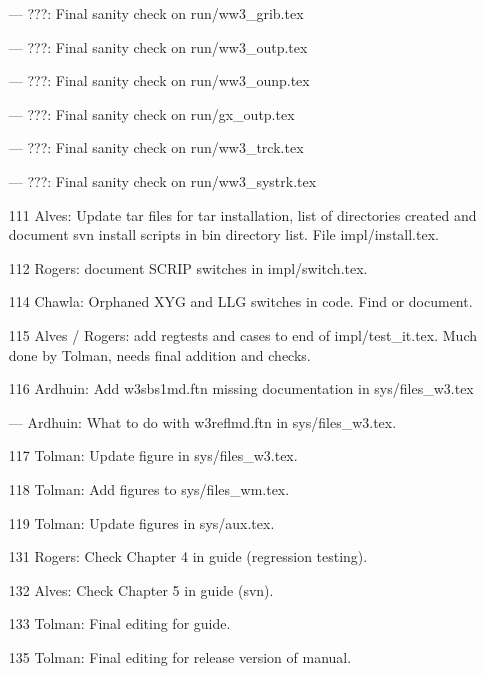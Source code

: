 \begin{itemize}
\item[---] ???: Final sanity check on run/ww3\_grib.tex

\item[---] ???: Final sanity check on run/ww3\_outp.tex

\item[---] ???: Final sanity check on run/ww3\_ounp.tex

\item[---] ???: Final sanity check on run/gx\_outp.tex

\item[---] ???: Final sanity check on run/ww3\_trck.tex

\item[---] ???: Final sanity check on run/ww3\_systrk.tex

\item[111] Alves: Update tar files for tar installation, list of directories
  created and document svn install scripts in bin directory list. File
  impl/install.tex. 

\item[112] Rogers: document SCRIP switches in impl/switch.tex.


\item[114] Chawla: Orphaned XYG and LLG switches in code. Find or document.

\item[115] Alves / Rogers: add regtests and cases to end of
  impl/test\_it.tex. Much done by Tolman, needs final addition and checks. 

\item[116] Ardhuin: Add w3sbs1md.ftn missing documentation in sys/files\_w3.tex

\item[---] Ardhuin: What to do with w3reflmd.ftn in sys/files\_w3.tex.

\item[117] Tolman: Update figure in sys/files\_w3.tex.

\item[118] Tolman: Add figures to sys/files\_wm.tex.

\item[119] Tolman: Update figures in sys/aux.tex.

\item [131] Rogers: Check Chapter 4 in guide (regression testing).

\item [132] Alves: Check Chapter 5 in guide (svn).

\item [133] Tolman: Final editing for guide. 

\item [135] Tolman: Final editing for release version of manual.

\end{itemize}

\bpage
\pagestyle{empty}
